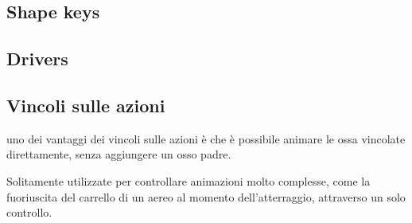 \subsection{Shape keys}
\subsection{Drivers}
\subsection{Vincoli sulle azioni}
uno dei vantaggi dei vincoli sulle azioni è che è possibile animare le ossa vincolate direttamente, senza aggiungere un osso padre.

Solitamente utilizzate per controllare animazioni molto complesse, come la fuoriuscita del carrello di un aereo al momento dell'atterraggio, attraverso un solo controllo.

